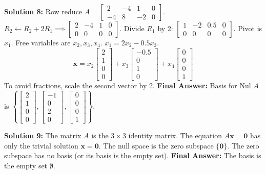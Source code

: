\documentclass[11pt]{article}
\begin{document}
\vspace{0.5cm}
\textbf{Solution 8:}
Row reduce $A = \begin{bmatrix} 2 & -4 & 1 & 0 \\ -4 & 8 & -2 & 0 \end{bmatrix}$.
$R_2 \leftarrow R_2 + 2R_1 \implies \begin{bmatrix} 2 & -4 & 1 & 0 \\ 0 & 0 & 0 & 0 \end{bmatrix}$.
Divide $R_1$ by 2: $\begin{bmatrix} 1 & -2 & 0.5 & 0 \\ 0 & 0 & 0 & 0 \end{bmatrix}$.
Pivot is $x_1$. Free variables are $x_2, x_3, x_4$.
$x_1 = 2x_2 - 0.5x_3$.
$$ \mathbf{x} = x_2 \begin{bmatrix} 2 \\ 1 \\ 0 \\ 0 \end{bmatrix} + x_3 \begin{bmatrix} -0.5 \\ 0 \\ 1 \\ 0 \end{bmatrix} + x_4 \begin{bmatrix} 0 \\ 0 \\ 0 \\ 1 \end{bmatrix} $$
To avoid fractions, scale the second vector by 2.
\textbf{Final Answer:} Basis for Nul $A$ is $\left\{ \begin{bmatrix} 2 \\ 1 \\ 0 \\ 0 \end{bmatrix}, \begin{bmatrix} -1 \\ 0 \\ 2 \\ 0 \end{bmatrix}, \begin{bmatrix} 0 \\ 0 \\ 0 \\ 1 \end{bmatrix} \right\}$.

\vspace{0.5cm}
\textbf{Solution 9:}
The matrix $A$ is the $3 \times 3$ identity matrix. The equation $A\mathbf{x} = \mathbf{0}$ has only the trivial solution $\mathbf{x} = \mathbf{0}$. The null space is the zero subspace $\{\mathbf{0}\}$. The zero subspace has no basis (or its basis is the empty set).
\textbf{Final Answer:} The basis is the empty set $\emptyset$.
\end{document}
